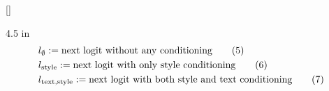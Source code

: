 \documentclass[12pt]{standalone}
\begin{document}
    [\textcolor{tcol}]{\color{tcol}}{}
    \begin{varwidth}{4.5 in}
        \begin{align*}
            \MoveEqLeft \color{tcol}{l_{\emptyset} := \text{next logit without any conditioning} \tag{5}} \\
            \MoveEqLeft \color{tcol}{l_{\text{style}} := \text{next logit with only style conditioning} \tag{6}} \\
            \MoveEqLeft \color{tcol}{l_{\text{text,style}} := \text{next logit with both style and text conditioning} \tag{7}} \\
        \end{align*}
    \end{varwidth}
\end{document}

